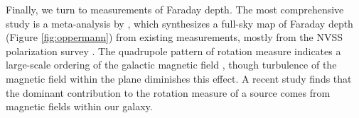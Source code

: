 Finally, we turn to measurements of Faraday depth. The most comprehensive study is a meta-analysis
by \citet{Oppermann2012}, which synthesizes a full-sky map of Faraday depth (Figure
\ref{fig:oppermann}) from existing measurements, mostly from the NVSS polarization survey
\cite{NVSS, Taylor2009}. The quadrupole pattern of rotation measure indicates a large-scale ordering
of the galactic magnetic field \cite{Kronberg2011,Pshirkov2011}, though turbulence of the magnetic
field within the plane diminishes this effect. A recent study \cite{Oppermann2014} finds that the
dominant contribution to the rotation measure of a source comes from magnetic fields within our galaxy.
